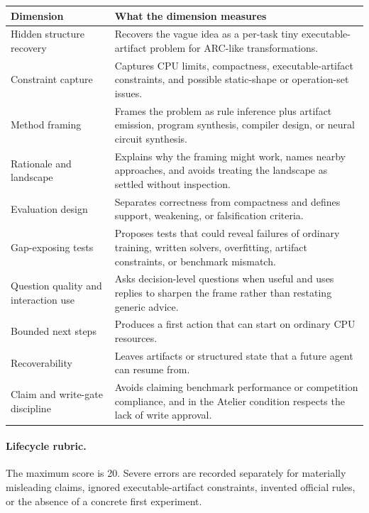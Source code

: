 \begin{center}
  \scriptsize
  \setlength{\tabcolsep}{4pt}
  \begin{tabular}{@{}p{}p{}@{}}
    \toprule
    Dimension & What the dimension measures \\
    \midrule
    Hidden structure recovery & Recovers the vague idea as a per-task tiny executable-artifact problem for ARC-like transformations. \\
    Constraint capture & Captures CPU limits, compactness, executable-artifact constraints, and possible static-shape or operation-set issues. \\
    Method framing & Frames the problem as rule inference plus artifact emission, program synthesis, compiler design, or neural circuit synthesis. \\
    Rationale and landscape & Explains why the framing might work, names nearby approaches, and avoids treating the landscape as settled without inspection. \\
    Evaluation design & Separates correctness from compactness and defines support, weakening, or falsification criteria. \\
    Gap-exposing tests & Proposes tests that could reveal failures of ordinary training, written solvers, overfitting, artifact constraints, or benchmark mismatch. \\
    Question quality and interaction use & Asks decision-level questions when useful and uses replies to sharpen the frame rather than restating generic advice. \\
    Bounded next steps & Produces a first action that can start on ordinary CPU resources. \\
    Recoverability & Leaves artifacts or structured state that a future agent can resume from. \\
    Claim and write-gate discipline & Avoids claiming benchmark performance or competition compliance, and in the Atelier condition respects the lack of write approval. \\
    \bottomrule
  \end{tabular}
\end{center}

\paragraph{Lifecycle rubric.}
The maximum score is 20. Severe errors are recorded separately for materially misleading claims, ignored executable-artifact constraints, invented official rules, or the absence of a concrete first experiment.

